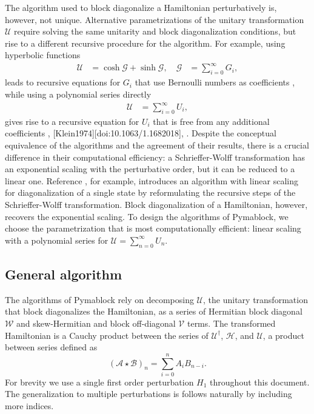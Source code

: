 The algorithm used to block diagonalize a Hamiltonian perturbatively is,
however, not unique.
Alternative parametrizations of the unitary transformation $\mathcal{U}$
require solving the same unitarity and block diagonalization conditions, but
rise to a different recursive procedure for the algorithm.
For example, using hyperbolic functions
%
\begin{align}
\mathcal{U} &= \cosh{\mathcal{G}} + \sinh{\mathcal{G}}, \quad
\mathcal{G} &= \sum_{i=0}^{\infty} G_i,
\end{align}
%
leads to recursive equations for $G_i$ that use Bernoulli numbers as
coefficients \cite{Shavitt_1980}, while using a polynomial
series directly
%
\begin{align}
\mathcal{U} &= \sum_{i=0}^{\infty} U_i,
\end{align}
%
gives rise to a recursive equation for $U_i$ that is free from any additional
coefficients
\cite{Van_Vleck_1929}, \cite{L_wdin_1962}
[Klein1974][doi:10.1063/1.1682018], \cite{Suzuki_1983}.
Despite the conceptual equivalence of the algorithms and the agreement of
their results, there is a crucial difference in their computational efficiency:
a Schrieffer-Wolff transformation has an exponential scaling with the
perturbative order, but it can be reduced to a linear one.
Reference \cite{Li_2022}, for example, introduces an
algorithm with linear scaling for diagonalization of a single state by
reformulating the recursive steps of the Schrieffer-Wolff transformation.
Block diagonalization of a Hamiltonian, however, recovers the exponential
scaling.
To design the algorithms of Pymablock, we choose the parametrization that is
most computationally efficient: linear scaling with a polynomial series for
$\mathcal{U} = \sum_{n=0}^{\infty} U_n$.

\subsection{General algorithm}

The algorithms of Pymablock rely on decomposing $\mathcal{U}$, the unitary transformation
that block diagonalizes the Hamiltonian, as a series of Hermitian
block diagonal $\mathcal{W}$ and skew-Hermitian and block off-diagonal $\mathcal{V}$ terms.
The transformed Hamiltonian is a Cauchy product between the series of
$\mathcal{U}^{\dagger}$, $\mathcal{H}$, and $\mathcal{U}$, a product between
series defined as
%
\begin{equation}
\label{cauchy_product}
(\mathcal{A} \star \mathcal{B})_{n} = \sum_{i=0}^{n} A_{i} B_{n-i}.
\end{equation}
%
For brevity we use a single first order perturbation $H_1$ throughout this
document. The generalization to multiple perturbations is follows naturally
by including more indices.

